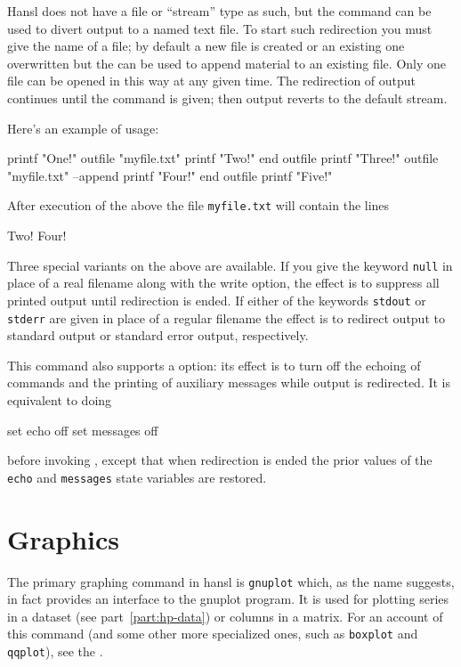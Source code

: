 Hansl does not have a file or ``stream'' type as such, but the
 command can be used to divert output to a named text
file. To start such redirection you must give the name of a file; by
default a new file is created or an existing one overwritten but the
 can be used to append material to an existing file.
Only one file can be opened in this way at any given time. The
redirection of output continues until the command  is
given; then output reverts to the default stream.

Here's an example of usage:
\begin{code}
  printf "One!\n"
  outfile "myfile.txt"
    printf "Two!\n"
  end outfile
  printf "Three!\n"
  outfile "myfile.txt" --append
    printf "Four!\n"
  end outfile
  printf "Five!\n"
\end{code}
After execution of the above the file \texttt{myfile.txt} will contain
the lines
\begin{code}
Two!
Four!  
\end{code}

Three special variants on the above are available. If you give the
keyword \texttt{null} in place of a real filename along with the write
option, the effect is to suppress all printed output until redirection
is ended. If either of the keywords \texttt{stdout} or \texttt{stderr}
are given in place of a regular filename the effect is to redirect
output to standard output or standard error output, respectively.

This command also supports a  option: its effect is to
turn off the echoing of commands and the printing of auxiliary
messages while output is redirected. It is equivalent to doing
\begin{code}
  set echo off 
  set messages off
\end{code}
before invoking , except that when redirection is ended
the prior values of the \texttt{echo} and \texttt{messages} state
variables are restored.

\section{Graphics}

The primary graphing command in hansl is \texttt{gnuplot} which, as
the name suggests, in fact provides an interface to the
\textsf{gnuplot} program. It is used for plotting series in a dataset
(see part~\ref{part:hp-data}) or columns in a matrix. For an account
of this command (and some other more specialized ones, such as
\texttt{boxplot} and \texttt{qqplot}), see the \GCR.

